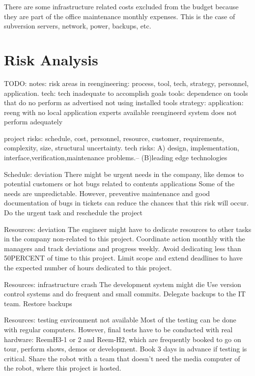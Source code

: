 There are some infrastructure related costs excluded from the budget because they are part of the office maintenance monthly expenses.
This is the case of subversion servers, network, power, backups, etc. 

\section{Risk Analysis}
TODO: notes: risk areas in reengineering: process, tool,  tech, strategy, personnel, application.
tech:  tech inadequate to accomplish goals
tools: dependence on tools that do no perform as advertised
not using installed tools
strategy: 
application: reeng with no local application experts available 
reengineerd system does not perform adequately

project risks: schedule, cost, personnel, resource, customer, requirements, complexity, size, structural uncertainty. 
tech risks: A) design, implementation, interface,verification,maintenance problems.– (B)leading edge technologies

\label{sec:risk}
\begin{risk}
{Schedule: deviation}
{There might be urgent needs in the company, like demos to potential customers or hot bugs related to contents applications}
{Some of the needs are unpredictable. However, preventive maintenance and good documentation of bugs in tickets can reduce the chances that this risk will occur.}
{Do the urgent task and reschedule the project}
\end{risk}


\begin{risk}
{Resources: deviation}
{The engineer might have to dedicate resources to other tasks in the company non-related to this project.}
{Coordinate action monthly with the managers and track deviations and progress weekly. Avoid dedicating less than 50PERCENT of time to this project.}
{Limit scope and extend deadlines to have the expected number of hours dedicated to this project.}
\end{risk}

\begin{risk}
{Resources: infrastructure crash}
{The development system might die}
{Use version control systems and do frequent and small commits. Delegate backups to the IT team.}
{Restore backups}
\end{risk}

\begin{risk}
{Resources: testing environment not available}
{Most of the testing can be done with regular computers. However, final tests have to be conducted with real hardware: ReemH3-1 or 2 and Reem-H2, which are frequently booked to go on tour, perform shows, demos or development.}
{Book 3 days in advance if testing is critical. }
{Share the robot with a team that doesn't need the media computer of the robot, where this project is hosted.}
\end{risk}

